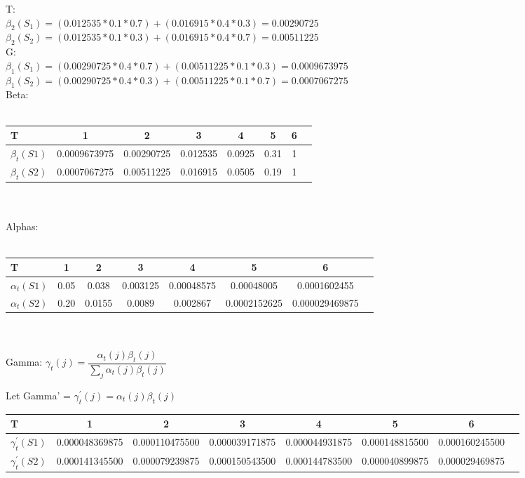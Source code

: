 \documentclass[paper=a4, fontsize=11pt]{scrartcl} %
\numberwithin{equation}{section} %
\numberwithin{figure}{section} %
\numberwithin{table}{section} %
\begin{document}
T:\\
$\beta_{2}(S_{1}) = (0.012535*0.1*0.7) + (0.016915*0.4*0.3) = 0.00290725$\\
$\beta_{2}(S_{2}) = (0.012535*0.1*0.3) + (0.016915*0.4*0.7) = 0.00511225$\\


G:\\
$\beta_{1}(S_{1}) = (0.00290725*0.4*0.7) + (0.00511225*0.1*0.3) = 0.0009673975$\\
$\beta_{1}(S_{2}) = (0.00290725*0.4*0.3) + (0.00511225*0.1*0.7) = 0.0007067275$\\




Beta:\\\\
\begin{tabular}{l*{7}{c}}
\textbf{T} & \textbf{1} &  \textbf{2} & \textbf{3} & \textbf{4} & \textbf{5} & \textbf{6} \\
\hline
\textbf{$\beta_{t}(S1)$} & 0.0009673975 & 0.00290725 & 0.012535 & 0.0925 & 0.31 & 1\\
\textbf{$\beta_{t}(S2)$} & 0.0007067275 & 0.00511225 & 0.016915 & 0.0505 & 0.19 & 1
\end{tabular}\\\\

Alphas:\\\\
\begin{tabular}{l*{7}{c}}
\textbf{T} & \textbf{1} &  \textbf{2} & \textbf{3} & \textbf{4} & \textbf{5} & \textbf{6} \\
\hline
\textbf{$\alpha_{t}(S1)$} & 0.05 & 0.038 & 0.003125 & 0.00048575 & 0.00048005 & 0.0001602455\\
\textbf{$\alpha_{t}(S2)$} & 0.20 & 0.0155 & 0.0089 & 0.002867 & 0.0002152625 & 0.000029469875
\end{tabular}\\\\


Gamma: $\gamma_{t}(j) = \dfrac{\alpha_{t}(j)\beta_{t}(j)}{\sum_{j}\alpha_{t}(j)\beta_{t}(j)}$

Let Gamma' = $\gamma_{t}^{'}(j) = \alpha_{t}(j)\beta_{t}(j)$\\

\begin{tabular}{l*{7}{c}}
\textbf{T} & \textbf{1} &  \textbf{2} & \textbf{3} & \textbf{4} & \textbf{5} & \textbf{6} \\
\hline
\textbf{$\gamma_{t}^{'}(S1)$} & 0.000048369875 & 0.000110475500 & 0.000039171875 & 0.000044931875 & 0.000148815500 & 0.000160245500\\
\textbf{$\gamma_{t}^{'}(S2)$} & 0.000141345500 & 0.000079239875 & 0.000150543500 & 0.000144783500 & 0.000040899875 & 0.000029469875
\end{tabular}\\\\
\end{document}

